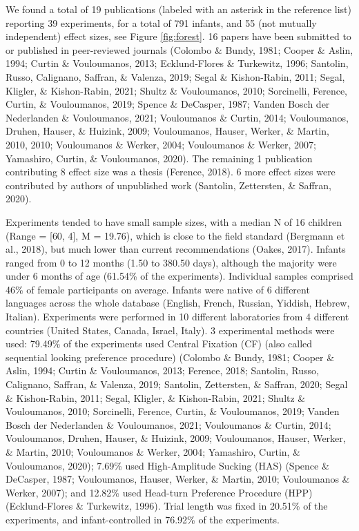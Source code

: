 \documentclass[
  english,
  man]{apa6}
\begin{document}
We found a total of 19 publications (labeled with an asterisk in the reference list) reporting 39 experiments, for a total of 791 infants, and 55 (not mutually independent) effect sizes, see Figure \ref{fig:forest}. 16 papers have been submitted to or published in peer-reviewed journals (Colombo \& Bundy, 1981; Cooper \& Aslin, 1994; Curtin \& Vouloumanos, 2013; Ecklund-Flores \& Turkewitz, 1996; Santolin, Russo, Calignano, Saffran, \& Valenza, 2019; Segal \& Kishon-Rabin, 2011; Segal, Kligler, \& Kishon-Rabin, 2021; Shultz \& Vouloumanos, 2010; Sorcinelli, Ference, Curtin, \& Vouloumanos, 2019; Spence \& DeCasper, 1987; Vanden Bosch der Nederlanden \& Vouloumanos, 2021; Vouloumanos \& Curtin, 2014; Vouloumanos, Druhen, Hauser, \& Huizink, 2009; Vouloumanos, Hauser, Werker, \& Martin, 2010, 2010; Vouloumanos \& Werker, 2004; Vouloumanos \& Werker, 2007; Yamashiro, Curtin, \& Vouloumanos, 2020). The remaining 1 publication contributing 8 effect size was a thesis (Ference, 2018). 6 more effect sizes were contributed by authors of unpublished work (Santolin, Zettersten, \& Saffran, 2020).

Experiments tended to have small sample sizes, with a median N of 16 children (Range = {[}60, 4{]}, M = 19.76), which is close to the field standard (Bergmann et al., 2018), but much lower than current recommendations (Oakes, 2017). Infants ranged from 0 to 12 months (1.50 to 380.50 days), although the majority were under 6 months of age (61.54\% of the experiments). Individual samples comprised 46\% of female participants on average. Infants were native of 6 different languages across the whole database (English, French, Russian, Yiddish, Hebrew, Italian).
Experiments were performed in 10 different laboratories from 4 different countries (United States, Canada, Israel, Italy). 3 experimental methods were used: 79.49\% of the experiments used Central Fixation (CF) (also called sequential looking preference procedure) (Colombo \& Bundy, 1981; Cooper \& Aslin, 1994; Curtin \& Vouloumanos, 2013; Ference, 2018; Santolin, Russo, Calignano, Saffran, \& Valenza, 2019; Santolin, Zettersten, \& Saffran, 2020; Segal \& Kishon-Rabin, 2011; Segal, Kligler, \& Kishon-Rabin, 2021; Shultz \& Vouloumanos, 2010; Sorcinelli, Ference, Curtin, \& Vouloumanos, 2019; Vanden Bosch der Nederlanden \& Vouloumanos, 2021; Vouloumanos \& Curtin, 2014; Vouloumanos, Druhen, Hauser, \& Huizink, 2009; Vouloumanos, Hauser, Werker, \& Martin, 2010; Vouloumanos \& Werker, 2004; Yamashiro, Curtin, \& Vouloumanos, 2020); 7.69\% used High-Amplitude Sucking (HAS) (Spence \& DeCasper, 1987; Vouloumanos, Hauser, Werker, \& Martin, 2010; Vouloumanos \& Werker, 2007); and 12.82\% used Head-turn Preference Procedure (HPP) (Ecklund-Flores \& Turkewitz, 1996). Trial length was fixed in 20.51\% of the experiments, and infant-controlled in 76.92\% of the experiments.
\end{document}
